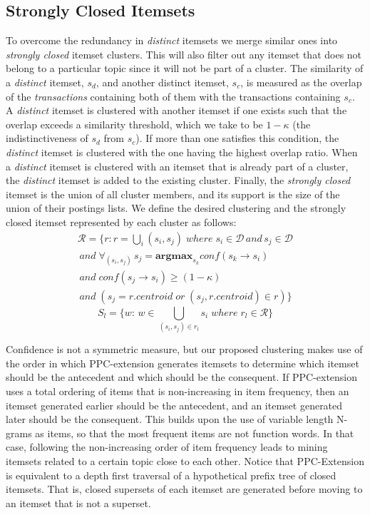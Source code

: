 \documentclass{sig-alternate}
\begin{document}
\subsection{Strongly Closed Itemsets}
To overcome the redundancy in \emph{distinct} itemsets 
we merge similar ones
into \emph{strongly closed} itemset clusters.
This will also filter out any itemset 
that does not belong to a particular topic
since it will not be part of a cluster.
The similarity of a \emph{distinct} itemset,
$s_d$, and another distinct itemset, $s_c$,
is measured as the overlap of the \emph{transactions} containing both of them
with the transactions containing $s_c$. 
A \emph{distinct} itemset is clustered with another itemset if one exists
such that the overlap exceeds a similarity threshold,
which we take to be $1-\kappa$ (the indistinctiveness of $s_d$ from $s_c$).
If more than one satisfies this condition,
the  \emph{distinct} itemset is clustered with the 
one having the highest overlap ratio.
When  a \emph{distinct} itemset is clustered with an itemset that is already
part of a cluster, the \emph{distinct} itemset is added to the existing cluster.
Finally, the \emph{strongly closed} itemset is the union of all cluster members,
and its support is the size of the union of their postings lists.
We define the  desired clustering  and the strongly closed itemset
represented by each cluster as follows:
\begin{align*}\label{eq:strongClosedFormal}
\mathcal{R} = \{r: r = \bigcup_i{(s_i, s_j)}\; where\; s_i \in \mathcal{D} \, and \, s_j \in \mathcal{D} 
\\\,and\; \forall_{(s_i,s_j)} \, s_j = \textbf{argmax}_{s_k} conf(s_k \rightarrow s_i) \\\,and \;conf(s_j \rightarrow s_i) \ge (1-\kappa)
\\\, and\;( s_j = r.centroid\; or \; (s_j, r.centroid) \in r )\}
\end{align*}
\begin{equation}S_l = \{w:\, w \in \bigcup_{(s_i, s_j) \in r_l}{s_i} \; where \; r_l \in \mathcal{R}\}\end{equation}

Confidence is not a symmetric measure,
but our proposed clustering makes use of the order
in which PPC-extension generates itemsets 
to determine which itemset should be the antecedent 
and which should be the consequent.
If PPC-extension uses a total ordering 
of items that is non-increasing in item frequency,
then 
an itemset generated earlier 
should be the antecedent, and
an itemset generated later
should be the consequent.
This builds upon the use of
variable length N-grams
as items,
so that the most frequent items
are not function words.
In that case, following the non-increasing order 
of item frequency leads to mining itemsets related 
to a certain topic close to each other.
Notice that PPC-Extension is equivalent to a depth first traversal 
of a hypothetical prefix tree of closed itemsets.
That is, closed supersets of each itemset are generated before 
moving to an itemset that is not a superset. 
\end{document}
